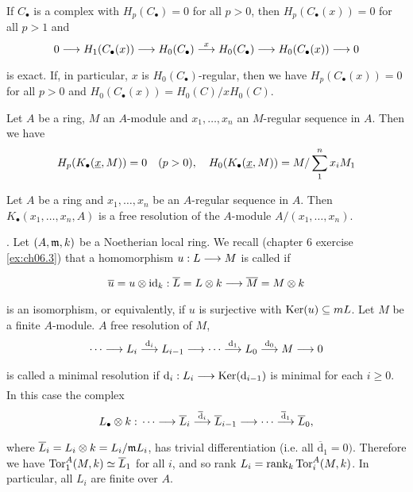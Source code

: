 \documentclass[../main]{subfiles}
\begin{document}
\begin{lemma}\label{lem:18.07}
If $C_\bullet$ is a complex with $H_{p}(C_\bullet)=0$ for all $p>0$, then $H_{p}(C_\bullet(x))=0$ for all $p>1$ and
\[
0 \varrightarrow{} H_{1}(C_\bullet(x)) \varrightarrow{} H_{0}(C_\bullet) \varrightarrow{x} H_{0}(C_\bullet) \varrightarrow{} H_{0}(C_\bullet(x)) \varrightarrow{} 0
\]
is exact. If, in particular, $x$ is $H_{0}(C_\bullet)$-regular, then we have $H_{p}(C_\bullet(x))=0$ for all $p>0$ and $H_{0}(C_\bullet(x))=H_{0}(C) / xH_{0}(C)$.
\end{lemma} 

\begin{theorem}\label{thm:043} Let $A$ be a ring, $M$ an $A$-module and $x_{1}, \dots, x_{n}$ an $M$-regular sequence in $A$. Then we have
\[
H_{p}(K_\bullet(\underline{x}, M))=0\for{p>0}, \quad H_{0}(K_\bullet(\underline{x}, M))=M / \sum_{1}^{n} x_{i} M_{1}
\]
\end{theorem}
\begin{corollary} Let $A$ be a ring and $x_{1}, \dots, x_{n}$ be an $A$-regular sequence in $A$. Then $K_\bullet(x_{1}, \dots, x_{n}, A)$ is a free resolution of the $A$-module $A /(x_{1}, \dots, x_{n})$.
\end{corollary}

\newparagraph {}. Let $(A, \mathfrak{m}, k)$ be a Noetherian local ring. We recall (chapter 6 exercise \ref{ex:ch06.3}) that a homomorphism $u:L \varrightarrow{} M$ is called  if \[\overline{u}=u \otimes \id_{k}: \overline{L}=L \otimes k \varrightarrow{} \overline{M}=M \otimes k\] is an isomorphism, or equivalently, if $u$ is surjective with $\operatorname{Ker}(u) \subseteq m L$. Let $M$ be a finite $A$-module. $A$ free resolution of $M$,
\[\cdots\varrightarrow{} L_i \varrightarrow{\mathrm{d}_i} L_{i-1} \varrightarrow{}\cdots \varrightarrow{\mathrm{d}_1}L_0\varrightarrow{\mathrm{d}_0}M\varrightarrow{}0\]
is called a minimal resolution if $\dd_{i}: L_{i} \varrightarrow{} \Ker(\dd_{i-1})$ is minimal for each $i \geq 0$. In this case the complex \[L_\bullet\otimes k:\,\cdots\varrightarrow{} \overline{L}_i \varrightarrow{\overline{\mathrm{d}}_i} \overline{L}_{i-1} \varrightarrow{}\cdots \varrightarrow{\overline{\mathrm{d}}_1}\overline{L}_0,\] where $\overline{L}_{i}=L_{i} \otimes k=L_{i} / \mathfrak{m} L_{i}$, has trivial differentiation (i.e. all $\overline{\mathrm{d}}_{1}=0)$. Therefore we have $\operatorname{Tor}_{1}^{A}(M, k) \simeq \overline{L}_{1}$ for all $i$, and so rank $L_{i}=\operatorname{rank}_{k} \operatorname{Tor}_{i}^{A}(M, k)$. In particular, all $L_{i}$ are finite over $A$.
\end{document}
